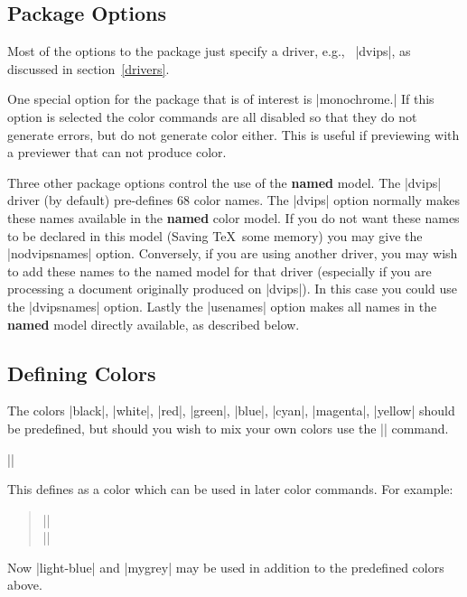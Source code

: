 \subsection{Package Options}
Most of the options to the  package just specify a
driver, e.g., \ |dvips|, as discussed in section~\ref{drivers}.

One special option for the  package
that is of interest is |monochrome.|
If this option is selected the color commands are all
disabled so that they do not generate errors, but do not generate color
either. This is useful if previewing with a previewer that can not
produce color.

Three other package options control the use of the \textbf{named} model.
The |dvips| driver (by default) pre-defines 68 color names. The |dvips|
option normally makes these names available in the \textbf{named} color
model. If you do not want these names to be declared in  this model
(Saving \TeX\ some memory) you may give the |nodvipsnames|
option. Conversely, if you are using another driver, you may wish to
add these names to the named model for that driver (especially if you
are processing a document originally produced on |dvips|). In this case
you could use the |dvipsnames| option. Lastly the |usenames| option
makes all names in the \textbf{named} model directly available, as
described below.

\subsection{Defining Colors}

The colors |black|, |white|, |red|, |green|, |blue|, |cyan|,
|magenta|, |yellow| should be predefined, but should you wish to mix
your own colors use the |\definecolor| command.

\begin{decl}
|\definecolor|
\end{decl}


This defines  as a color which can be used in later color
commands. For example:
\begin{quote}
  || \\
  ||
\end{quote}

Now |light-blue| and |mygrey| may be used in addition to the
predefined colors above.

